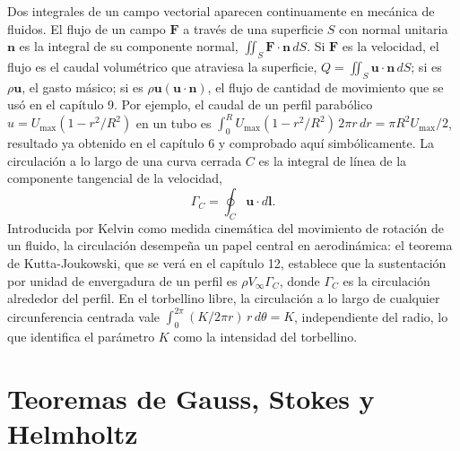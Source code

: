 \documentclass[10pt,openany]{book}
\begin{document}
Dos integrales de un campo vectorial aparecen continuamente en mecánica de fluidos. El flujo de un campo \(\mathbf{F}\) a través de una superficie \(S\) con normal unitaria \(\mathbf{n}\) es la integral de su componente normal, \(\iint_S \mathbf{F}\cdot\mathbf{n}\,dS\). Si \(\mathbf{F}\) es la velocidad, el flujo es el caudal volumétrico que atraviesa la superficie, \(Q = \iint_S \mathbf{u}\cdot\mathbf{n}\,dS\); si es \(\rho\mathbf{u}\), el gasto másico; si es \(\rho\mathbf{u}(\mathbf{u}\cdot\mathbf{n})\), el flujo de cantidad de movimiento que se usó en el capítulo 9. Por ejemplo, el caudal de un perfil parabólico \(u = U_{\max}(1 - r^{2}/R^{2})\) en un tubo es \(\int_0^{R} U_{\max}(1 - r^{2}/R^{2})\,2\pi r\,dr = \pi R^{2}U_{\max}/2\), resultado ya obtenido en el capítulo 6 y comprobado aquí simbólicamente. La circulación a lo largo de una curva cerrada \(C\) es la integral de línea de la componente tangencial de la velocidad,
\begin{equation}
\Gamma_C = \oint_C \mathbf{u}\cdot d\mathbf{l}. \label{eq:c11-circulacion}
\end{equation}
Introducida por Kelvin como medida cinemática del movimiento de rotación de un fluido, la circulación desempeña un papel central en aerodinámica: el teorema de Kutta-Joukowski, que se verá en el capítulo 12, establece que la sustentación por unidad de envergadura de un perfil es \(\rho V_\infty\Gamma_C\), donde \(\Gamma_C\) es la circulación alrededor del perfil. En el torbellino libre, la circulación a lo largo de cualquier circunferencia centrada vale \(\int_0^{2\pi}(K/2\pi r)\,r\,d\theta = K\), independiente del radio, lo que identifica el parámetro \(K\) como la intensidad del torbellino.

\section{Teoremas de Gauss, Stokes y Helmholtz}
\end{document}
